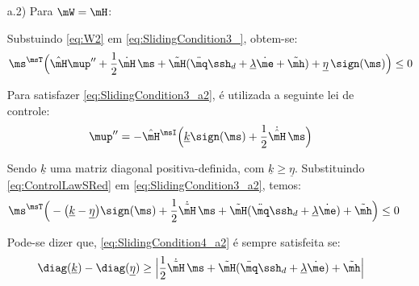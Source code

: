 \documentclass[]{politex}
\begin{document}
\begin{itemize}
\begin{itemize}
\eqref{eq:DesigualdadeK1} ser\'a respeitada, o que garante que a condi\c{c}\~ao de escorregamento \eqref{eq:SlidingCondition} tamb\'em seja respeitada e consequentemente garante a converg\^encia do erro de controle para zero.

Existe solu\c{c}\~ao para \eqref{eq:DesigualdadeK2_a1} apenas se a matriz $\mone - | \mH^\msI \tilde{\mH}|_{max}$ for uma \emph{M-matrix}, ou seja, se módulo do maior autovalor de $| \mH^\msI \tilde{\mH}|_{max}$ for menor que $1$. Se este for o caso, a solução que minimiza a norma de $\diag(\underline{k})$ é dada por:
\begin{equation} \label{eq:MatrizDiagk_a1}
\diag(\underline{k})  = (\mone - | \mH^\msI \tilde{\mH}|_{max} )^\msI (\diag(\underline{\eta}) + |\mH^\msI \tilde{\mH}|_{max} |\ddot{\mq}\ssh_d + \underline{\lambda} \dot{\me}| + |\mH^\msI\tilde{\mh}|_{max})
\end{equation}

\item[a.2)] Para $\mW = \mH$:


Substuindo \eqref{eq:W2} em \eqref{eq:SlidingCondition3_}, obtem-se:
\begin{equation} \label{eq:SlidingCondition3_a2}
\ms^\msT \Big(\hat{\mH}\mup'' + \frac{1}{2} \dot{\mH} \, \ms +  \tilde{\mH}(\ddot{\mq}\ssh_d + \underline{\lambda} \dot{\me} + \tilde{\mh} ) + \underline{\eta} \, \sign(\ms) \Big) \leq 0
\end{equation}

Para satisfazer \eqref{eq:SlidingCondition3_a2}, é utilizada a seguinte lei de controle:
\begin{equation} \label{eq:ControlLawSRed_a2}
\mup'' =  - \hat{\mH}^\msI \Big( \underline{k} \sign(\ms) +  \frac{1}{2} \dot{\hat{\mH}} \, \ms \Big) 
\end{equation}

Sendo $\underline{k}$ uma matriz diagonal positiva-definida, com $\underline{k} \geq \underline{\eta} $. Substituindo \eqref{eq:ControlLawSRed} em \eqref{eq:SlidingCondition3_a2}, temos:
\begin{equation} \label{eq:SlidingCondition4_a2}
\ms^\msT \Big(- \big(\underline{k} - \underline{\eta} \big)  \sign(\ms) + \frac{1}{2} \dot{\tilde{\mH}} \, \ms + \tilde{\mH}(\ddot{\mq}\ssh_d + \underline{\lambda} \dot{\me}) + \tilde{\mh}  \Big) \leq 0
\end{equation}

Pode-se dizer que, \eqref{eq:SlidingCondition4_a2} \'e sempre satisfeita se:
\begin{equation} \label{eq:DesigualdadeK1_a2}
 \diag(\underline{k}) - \diag(\underline{\eta}) \geq  \Big| \frac{1}{2} \dot{\tilde{\mH}} \, \ms + \tilde{\mH}(\ddot{\mq}\ssh_d + \underline{\lambda} \dot{\me}) + \tilde{\mh} \Big|
\end{equation}


\end{itemize}
\end{itemize}
\end{document}
